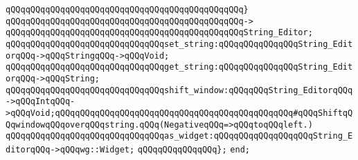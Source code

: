 \verb|qQQqqQQqqQQqqQQqqQQqqQQqqQQqqQQqqQQqqQQqqQQqqQQq}|\newline
\verb|qQQqqQQqqQQqqQQqqQQqqQQqqQQqqQQqqQQqqQQqqQQqqQQq->|\newline
\verb|qQQqqQQqqQQqqQQqqQQqqQQqqQQqqQQqqQQqqQQqqQQqqQQqString_Editor;|\newline
\newline
\verb|qQQqqQQqqQQqqQQqqQQqqQQqqQQqqQQqset_string:qQQqqQQqqQQqqQQqString_EditorqQQq->qQQqStringqQQq->qQQqVoid;|\newline
\verb|qQQqqQQqqQQqqQQqqQQqqQQqqQQqqQQqget_string:qQQqqQQqqQQqqQQqString_EditorqQQq->qQQqString;|\newline
\verb|qQQqqQQqqQQqqQQqqQQqqQQqqQQqqQQqshift_window:qQQqqQQqString_EditorqQQq->qQQqIntqQQq->qQQqVoid;qQQqqQQqqQQqqQQqqQQqqQQqqQQqqQQqqQQqqQQqqQQqqQQq#qQQqShiftqQQqwindowqQQqoverqQQqstring.qQQq(NegativeqQQq=>qQQqtoqQQqleft.)|\newline
\newline
\verb|qQQqqQQqqQQqqQQqqQQqqQQqqQQqqQQqas_widget:qQQqqQQqqQQqqQQqqQQqString_EditorqQQq->qQQqwg::Widget;|\newline
\verb|qQQqqQQqqQQqqQQq};|\newline
\newline
\verb|end;|\newline
\newline
\newline


